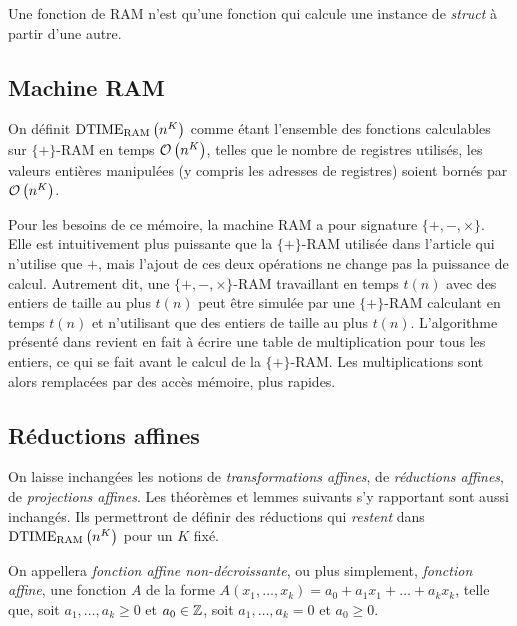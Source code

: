 		Une fonction de RAM n'est qu'une fonction qui calcule une instance de \emph{struct} à partir d'une autre. 
		
		
		
		\subsection{Machine RAM} %
		\label{subsec:machine_RAM}
		
		\begin{definition}
			\label{def:temps_poly_RAM}
			On définit $\text{DTIME}_{\text{RAM}}\left( n^K \right)$ comme étant l'ensemble des fonctions calculables sur $\{+\}$-RAM en temps $\mathcal{O}\left( n^K \right)$, telles que le nombre de registres utilisés, les valeurs entières manipulées (y compris les adresses de registres) soient bornés par $\mathcal{O}\left( n^K \right)$.
		\end{definition}
		
		Pour les besoins de ce mémoire, la machine RAM a pour signature $\{+ , -, \times \}$. Elle est intuitivement plus puissante que la $\{+\}$-RAM utilisée dans l'article \cite{Grandjean1994} qui n'utilise que $+$, mais l'ajout de ces deux opérations ne change pas la puissance de calcul. Autrement dit, une $\{+ , -, \times \}$-RAM travaillant en temps $t(n)$ avec des entiers de taille au plus $t(n)$ peut être simulée par une $\{+\}$-RAM calculant en temps $t(n)$ et n'utilisant que des entiers de taille au plus $t(n)$. 
		L'algorithme présenté dans \cite{GrandjeanSchwentick2002} revient en fait à écrire une table de multiplication pour tous les entiers, ce qui se fait avant le calcul de la $\{+\}$-RAM. Les multiplications sont alors remplacées par des accès mémoire, plus rapides.
		
		
		\subsection{Réductions affines} %
		\label{subsec:reductions_affines}
		
		On laisse inchangées les notions de \emph{transformations affines}, de \emph{réductions affines}, de \emph{projections affines}. Les théorèmes et lemmes suivants s'y rapportant sont aussi inchangés. Ils permettront de définir des réductions qui \emph{restent} dans $\text{DTIME}_{\text{RAM}}\left( n^K \right)$ pour un $K$ fixé. 
		
		\begin{definition}
			On appellera \emph{fonction affine non-décroissante}, ou plus simplement, \emph{fonction affine}, une fonction $A$ de la forme $A(x_1, \dots, x_k) = a_0 + a_1 x_1 + \dots + a_k x_k$, telle que, soit $a_1, \dots, a_k \geqslant 0$ et $a_0 \in \mathbb{Z}$, soit $a_1, \dots, a_k = 0$ et $a_0 \geqslant 0$.
		\end{definition}
		
